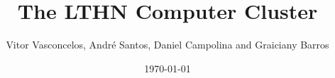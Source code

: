 \documentclass[notitlepage, 11pt]{report}
\title{The LTHN Computer Cluster}
\author{Vitor Vasconcelos, Andr\'e Santos, Daniel Campolina and Graiciany Barros}
\date{\today}
\begin{document}
\maketitle
\thispagestyle{empty}

\begin{abstract}
  \normalsize

\end{abstract}
\end{document}
